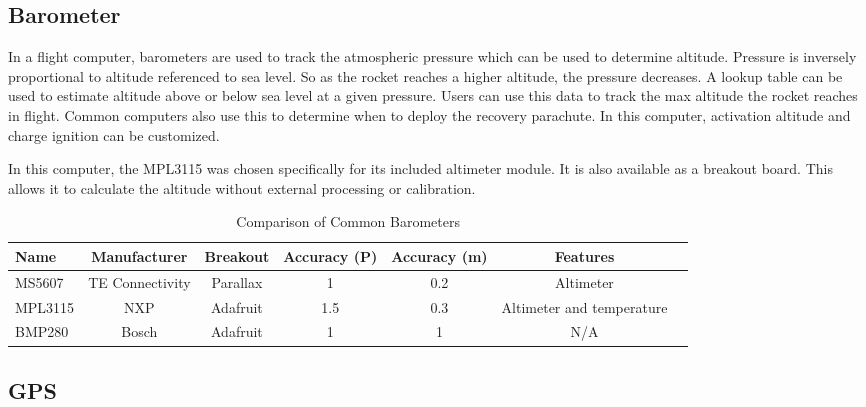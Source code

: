 \documentclass[conf]{new-aiaa}
\begin{document}

\subsection{Barometer}

In a flight computer, barometers are used to track the atmospheric pressure which can be used to determine altitude. Pressure is inversely proportional to altitude referenced to sea level. So as the rocket reaches a higher altitude, the pressure decreases. A lookup table can be used to estimate altitude above or below sea level at a given pressure. Users can use this data to track the max altitude the rocket reaches in flight. Common computers also use this to determine when to deploy the recovery parachute. In this computer, activation altitude and charge ignition can be customized.

In this computer, the MPL3115 was chosen specifically for its included altimeter module\cite{mpl3115}. It is also available as a breakout board\cite{mpl3115adafruit}. This allows it to calculate the altitude without external processing or calibration.

 \begin{table}[H]
 \caption{\label{tab:barometers} Comparison of Common Barometers}
 \centering
 \begin{tabular}{lcccccc}
 
 \hline Name & Manufacturer & Breakout & Accuracy (P) & Accuracy (m) & Features\\ \hline

 MS5607\cite{ms5607} & TE Connectivity & Parallax\cite{ms5607parallax} & 1 & 0.2 & Altimeter\\
 MPL3115\cite{mpl3115} & NXP & Adafruit\cite{mpl3115adafruit} & 1.5 & 0.3 & Altimeter and temperature\\
 BMP280\cite{bmp280} &  Bosch & Adafruit\cite{bmp280adafruit} & 1 & 1 & N/A \\
 
 \hline
 \end{tabular}
 \end{table}

\subsection{GPS}
\end{document}
